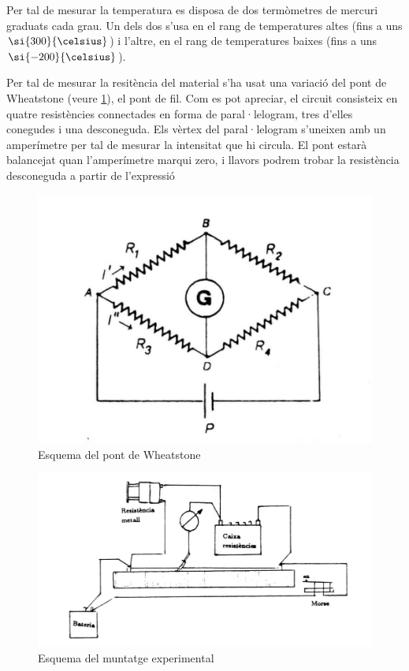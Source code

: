 Per tal de mesurar la temperatura es disposa de dos termòmetres de mercuri graduats cada grau. Un dels dos s'usa en el rang de temperatures altes (fins a uns $\si{300}{\celsius}$) i l'altre, en el rang de temperatures baixes (fins a uns $ \si{-200}{\celsius}$).

Per tal de mesurar la resitència del material s'ha usat una variació del pont de Wheatstone (veure \cref{fig: <Wheatstone>}), el pont de fil. Com es pot apreciar, el circuit consisteix en quatre resistències connectades en forma de paral·lelogram, tres d'elles conegudes i una desconeguda. Els vèrtex del paral·lelogram s'uneixen amb un amperímetre per tal de mesurar la intensitat que hi circula. El pont estarà balancejat quan l'amperímetre marqui zero, i llavors podrem trobar la resistència desconeguda a partir de l'expressió
\begin{figure}[h]
	\label{fig: <Wheatstone>}
	\centering
	\includegraphics{pont}
	\caption{Esquema del pont de Wheatstone}
\end{figure}

\begin{figure}[h]
	\label{fig: <muntatge>}
	\centering
	\includegraphics{muntatge}
	\caption{Esquema del muntatge experimental}
\end{figure}


